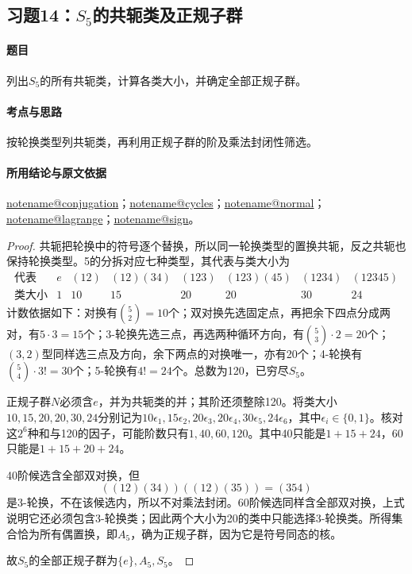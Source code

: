 \documentclass[UTF8,a4paper,11pt,fontset=windows]{ctexart}
\makeatletter
\newcommand{\noteref}[1]{\hyperref[note:#1]{\csname notename@#1\endcsname}}
\newcommand{\exref}[2]{\hyperref[ex:#1:#2]{第#1章习题#2}}
\makeatother
\begin{document}
\subsection{习题14：\texorpdfstring{$S_5$的共轭类及正规子群}{S5的共轭类及正规子群}}
\label{ex:2:14}

\paragraph{题目}
列出$S_5$的所有共轭类，计算各类大小，并确定全部正规子群。

\paragraph{考点与思路}
按轮换类型列共轭类，再利用正规子群的阶及乘法封闭性筛选。

\paragraph{所用结论与原文依据}
\noteref{conjugation}；\noteref{cycles}；\noteref{normal}；\noteref{lagrange}；\noteref{sign}。


\begin{proof}
共轭把轮换中的符号逐个替换，所以同一轮换类型的置换共轭，反之共轭也保持轮换类型。5的分拆对应七种类型，其代表与类大小为
\[
\begin{array}{c|rrrrrrr}
\text{代表}&e&(12)&(12)(34)&(123)&(123)(45)&(1234)&(12345)\\\hline
\text{类大小}&1&10&15&20&20&30&24
\end{array}
\]
计数依据如下：对换有$\binom52=10$个；双对换先选固定点，再把余下四点分成两对，有$5\cdot3=15$个；3-轮换先选三点，再选两种循环方向，有$\binom53\cdot2=20$个；$(3,2)$型同样选三点及方向，余下两点的对换唯一，亦有20个；4-轮换有$\binom54\cdot3!=30$个；5-轮换有$4!=24$个。总数为120，已穷尽$S_5$。

正规子群$N$必须含$e$，并为共轭类的并；其阶还须整除120。将类大小$10,15,20,20,30,24$分别记为$10\epsilon_1,15\epsilon_2,20\epsilon_3,20\epsilon_4,30\epsilon_5,24\epsilon_6$，其中$\epsilon_i\in\{0,1\}$。核对这$2^6$种和与120的因子，可能阶数只有$1,40,60,120$。其中40只能是$1+15+24$，60只能是$1+15+20+24$。

40阶候选含全部双对换，但
\[
((12)(34))((12)(35))=(354)
\]
是3-轮换，不在该候选内，所以不对乘法封闭。60阶候选同样含全部双对换，上式说明它还必须包含3-轮换类；因此两个大小为20的类中只能选择3-轮换类。所得集合恰为所有偶置换，即$A_5$，确为正规子群，因为它是符号同态的核。

故$S_5$的全部正规子群为$\{e\},A_5,S_5$。
\end{proof}
\end{document}
